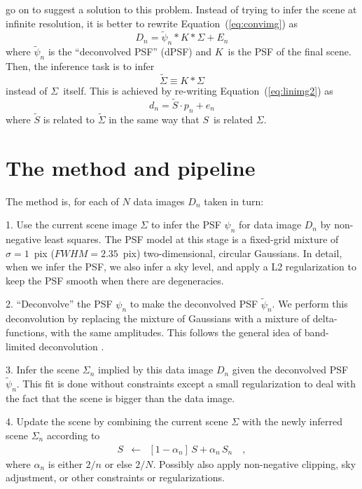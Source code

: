 \documentclass[12pt,preprint]{aastex}
\newcommand{\Eq}[1]{Equation~(\ref{eq:#1})}
\newcommand{\eq}[1]{\Eq{#1}}
\newcommand{\data}{\ensuremath{D}}
\newcommand{\scene}{\ensuremath{\Sigma}}
\newcommand{\kernel}{\ensuremath{K}}
\newcommand{\psf}{\ensuremath{\psi}}
\newcommand{\dpsf}{\ensuremath{\tilde{\psi}}}
\newcommand{\dvec}{\ensuremath{d}}
\newcommand{\evec}{\ensuremath{e}}
\newcommand{\smat}{\ensuremath{S}}
\newcommand{\pvec}{\ensuremath{p}}
\begin{document}
\citet{magain} go on to suggest a solution to this problem. Instead of
trying to infer the scene at infinite resolution, it is better to rewrite
\eq{convimg} as
\begin{equation}
    \data_n = \dpsf_n \ast \kernel \ast \scene + E_n
\end{equation}
where $\dpsf_n$ is the ``deconvolved PSF'' (dPSF) and \kernel\ is the
PSF of the final scene. Then, the inference task is to infer
\begin{equation}
    \tilde{\scene} \equiv \kernel \ast \scene
\end{equation}
instead of \scene\ itself. This is achieved by re-writing \eq{linimg2} as
\begin{equation}
    \dvec_n = \tilde{\smat} \cdot \pvec_n + \evec_n
\end{equation}
where $\tilde{\smat}$ is related to $\tilde{\scene}$ in the same way that
\smat\ is related \scene.

\section{The method and pipeline}

The method is, for each of $N$ data images $\data_n$ taken in turn:

1. Use the current scene image $\scene$ to infer the PSF $\psf_n$ for data
image $\data_n$ by non-negative least squares.  The PSF model at this
stage is a fixed-grid mixture of $\sigma=1$~pix ($FWHM = 2.35$~pix)
two-dimensional, circular Gaussians.  In detail, when we infer the
PSF, we also infer a sky level, and apply a L2 regularization to keep
the PSF smooth when there are degeneracies.

2. ``Deconvolve'' the PSF $\psf_n$ to make the deconvolved PSF
$\dpsf_n$. We perform this deconvolution by replacing the mixture of
Gaussians with a mixture of delta-functions, with the same amplitudes.
This follows the general idea of band-limited deconvolution
\citep{magain}.

3. Infer the scene $\scene_n$ implied by this data image $\data_n$ given the
deconvolved PSF $\dpsf_n$.  This fit is done without constraints
except a small regularization to deal with the fact that the scene is
bigger than the data image.

4. Update the scene by combining the current scene $\scene$ with the newly
inferred scene $\scene_n$ according to
\begin{eqnarray}\displaystyle
S &\leftarrow& [1-\alpha_n]\,S + \alpha_n\,S_n
\quad ,
\end{eqnarray}
where $\alpha_n$ is either $2/n$ or else $2/N$.  Possibly also apply
non-negative clipping, sky adjustment, or other constraints or
regularizations.
\end{document}
